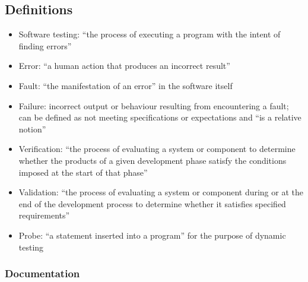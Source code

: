 \subsection{Definitions}

\begin{itemize}
      \item Software testing: ``the process of executing a program with the
            intent of finding errors'' \cite[p.~438]{peters_software_2000}
      \item Error: ``a human action that produces an incorrect result''
            \cite[p.~399]{van_vliet_software_2000}
      \item Fault: ``the manifestation of an error'' in the software itself
            \cite[p.~400]{van_vliet_software_2000}
      \item Failure: incorrect output or behaviour resulting from encountering
            a fault; can be defined as not meeting specifications or
            expectations and ``is a relative notion''
            \cite[p.~400]{van_vliet_software_2000}
      \item Verification: ``the process of evaluating a system or component
            to determine whether the products of a given development phase
            satisfy the conditions imposed at the start of that phase''
            \cite[p.~400]{van_vliet_software_2000}
      \item Validation: ``the process of evaluating a system or component
            during or at the end of the development process to determine
            whether it satisfies specified requirements''
            \cite[p.~400]{van_vliet_software_2000}
      \item Probe: ``a statement inserted into a program'' for the purpose of
            dynamic testing \cite[p.~438]{peters_software_2000}
\end{itemize}

\subsubsection{Documentation}


